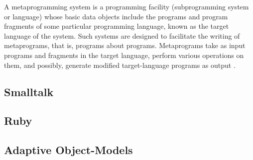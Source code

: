 A metaprogramming system is a programming facility (subprogramming system or language) whose basic data objects include the programs and program fragments of some particular programming language, known as the target language of the system. Such systems are designed to facilitate the writing of metaprograms, that is, programs about programs. Metaprograms take as input programs and fragments in the target language, perform various operations on them, and possibly, generate modified target-language programs as output \cite{CI84}. %

\subsection{Smalltalk}\label{sec:smalltalk}

\subsection{Ruby}\label{sec:ruby}

\subsection{Adaptive Object-Models}\label{sec:aom}

